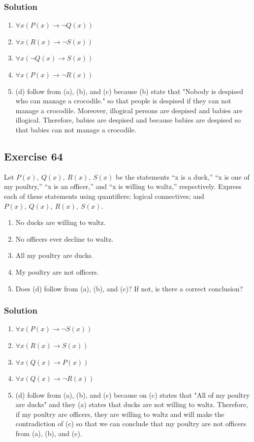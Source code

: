 \documentclass{article}
\begin{document}
\subsubsection*{Solution}
\begin{enumerate} [label = (\alph*)]
    \item $\forall x(P(x) \rightarrow \lnot Q(x))$
    \item $\forall x(R(x) \rightarrow \lnot S(x))$
    \item $\forall x(\lnot Q(x) \rightarrow S(x))$
    \item $\forall x(P(x) \rightarrow \lnot R(x))$
    \item (d) follow from (a), (b), and (c) because (b) state that "Nobody is despised who can manage a crocodile." so that people is despised if they can not manage a crocodile. Moreover, illogical persons are despised and babies are illogical. Therefore, babies are despised and because babies are despised so that babies can not manage a crocodile.
\end{enumerate}
\subsection*{Exercise 64}
Let $P(x),\ Q(x),\ R(x),\ S(x)$ be the statements “x is a duck,” “x is one of my poultry,” “x is an officer,” and “x is willing to waltz,” respectively. Express each of these statements using quantifiers; logical connectives; and $P(x),\ Q(x),\ R(x),\ S(x)$.
\begin{enumerate} [label = (\alph*)]
    \item No ducks are willing to waltz.
    \item No officers ever decline to waltz.
    \item All my poultry are ducks.
    \item My poultry are not officers.
    \item Does (d) follow from (a), (b), and (c)? If not, is there a correct conclusion?
\end{enumerate}
\subsubsection*{Solution}
\begin{enumerate} [label = (\alph*)]
    \item $\forall x(P(x) \rightarrow \lnot S(x))$
    \item $\forall x(R(x) \rightarrow S(x))$
    \item $\forall x(Q(x) \rightarrow P(x))$
    \item $\forall x(Q(x) \rightarrow \lnot R(x))$
    \item (d) follow from (a), (b), and (c) because on (c) states that "All of my poultry are ducks" and they (a) states that ducks are not willing to waltz. Therefore, if my poultry are officers, they are willing to waltz and will make the contradiction of (c) so that we can conclude that my poultry are not officers from (a), (b), and (c).
\end{enumerate}
\end{document}
